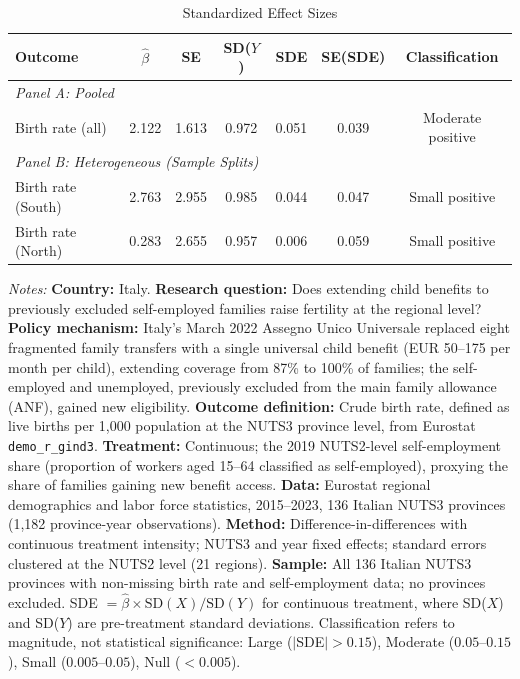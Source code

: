 \begin{table}[t]
\centering
\caption{Standardized Effect Sizes}
\label{tab:sde}
\small
\begin{tabular}{lcccccc}
\toprule
Outcome & $\hat{\beta}$ & SE & SD($Y$) & SDE & SE(SDE) & Classification \\
\midrule
\multicolumn{7}{l}{\textit{Panel A: Pooled}} \\
Birth rate (all) & 2.122 & 1.613 & 0.972 & 0.051 & 0.039 & Moderate positive \\
\midrule
\multicolumn{7}{l}{\textit{Panel B: Heterogeneous (Sample Splits)}} \\
Birth rate (South) & 2.763 & 2.955 & 0.985 & 0.044 & 0.047 & Small positive \\
Birth rate (North) & 0.283 & 2.655 & 0.957 & 0.006 & 0.059 & Small positive \\
\bottomrule
\end{tabular}
\par\vspace{0.3em}\begin{flushleft}\small
\textit{Notes:} \textbf{Country:} Italy. \textbf{Research question:} Does extending child benefits to previously excluded self-employed families raise fertility at the regional level? \textbf{Policy mechanism:} Italy's March 2022 Assegno Unico Universale replaced eight fragmented family transfers with a single universal child benefit (EUR 50--175 per month per child), extending coverage from 87\% to 100\% of families; the self-employed and unemployed, previously excluded from the main family allowance (ANF), gained new eligibility. \textbf{Outcome definition:} Crude birth rate, defined as live births per 1,000 population at the NUTS3 province level, from Eurostat \texttt{demo\_r\_gind3}. \textbf{Treatment:} Continuous; the 2019 NUTS2-level self-employment share (proportion of workers aged 15--64 classified as self-employed), proxying the share of families gaining new benefit access. \textbf{Data:} Eurostat regional demographics and labor force statistics, 2015--2023, 136 Italian NUTS3 provinces (1,182 province-year observations). \textbf{Method:} Difference-in-differences with continuous treatment intensity; NUTS3 and year fixed effects; standard errors clustered at the NUTS2 level (21 regions). \textbf{Sample:} All 136 Italian NUTS3 provinces with non-missing birth rate and self-employment data; no provinces excluded. SDE $= \hat{\beta} \times \text{SD}(X) / \text{SD}(Y)$ for continuous treatment, where SD($X$) and SD($Y$) are pre-treatment standard deviations. Classification refers to magnitude, not statistical significance: Large ($|$SDE$| > 0.15$), Moderate ($0.05$--$0.15$), Small ($0.005$--$0.05$), Null ($< 0.005$).
\end{flushleft}
\end{table}
